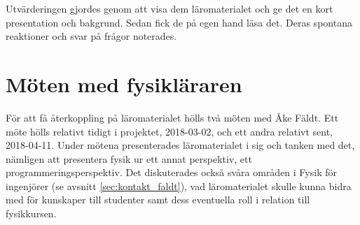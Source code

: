 Utvärderingen gjordes genom att visa dem läromaterialet och ge det en kort
presentation och bakgrund. Sedan fick de på egen hand läsa det. Deras spontana
reaktioner och svar på frågor noterades.

\section{Möten med fysikläraren}

För att få återkoppling på läromaterialet hölls två möten med Åke Fäldt. Ett möte hölls relativt
tidigt i projektet, 2018-03-02, och ett andra relativt sent, 2018-04-11.
Under mötena presenterades läromaterialet i sig och tanken med det, nämligen att
presentera fysik ur ett annat perspektiv, ett
programmeringsperspektiv. Det diskuterades också svåra områden i Fysik för
ingenjörer (se avsnitt \ref{sec:kontakt_faldt}), vad läromaterialet skulle kunna bidra med för kunskaper till
studenter samt dess eventuella roll i relation till fysikkursen.
